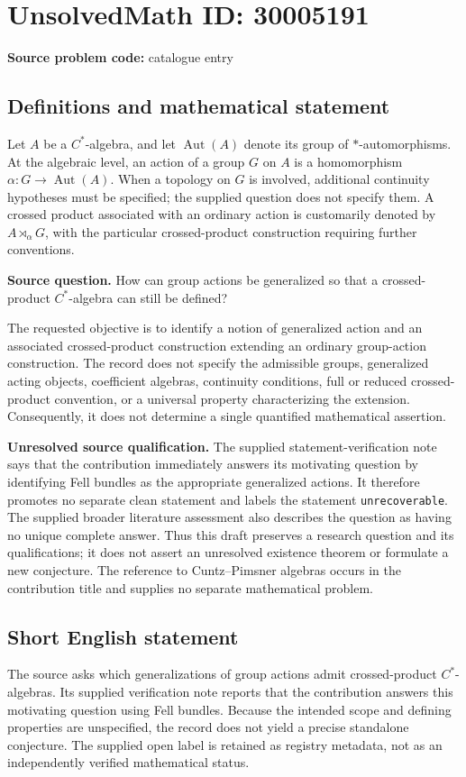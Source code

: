 \documentclass[11pt]{article}
\begin{document}
\section*{UnsolvedMath ID: 30005191}
\textbf{Source problem code:} catalogue entry
\subsection{Definitions and mathematical statement}
Let \(A\) be a \(C^*\)-algebra, and let \(\operatorname{Aut}(A)\) denote its group of \(*\)-automorphisms. At the algebraic level, an action of a group \(G\) on \(A\) is a homomorphism \(\alpha\colon G\to\operatorname{Aut}(A)\). When a topology on \(G\) is involved, additional continuity hypotheses must be specified; the supplied question does not specify them. A crossed product associated with an ordinary action is customarily denoted by \(A\rtimes_\alpha G\), with the particular crossed-product construction requiring further conventions.

\textbf{Source question.} How can group actions be generalized so that a crossed-product \(C^*\)-algebra can still be defined?

The requested objective is to identify a notion of generalized action and an associated crossed-product construction extending an ordinary group-action construction. The record does not specify the admissible groups, generalized acting objects, coefficient algebras, continuity conditions, full or reduced crossed-product convention, or a universal property characterizing the extension. Consequently, it does not determine a single quantified mathematical assertion.

\textbf{Unresolved source qualification.} The supplied statement-verification note says that the contribution immediately answers its motivating question by identifying Fell bundles as the appropriate generalized actions. It therefore promotes no separate clean statement and labels the statement \texttt{unrecoverable}. The supplied broader literature assessment also describes the question as having no unique complete answer. Thus this draft preserves a research question and its qualifications; it does not assert an unresolved existence theorem or formulate a new conjecture. The reference to Cuntz--Pimsner algebras occurs in the contribution title and supplies no separate mathematical problem.
\subsection{Short English statement}
The source asks which generalizations of group actions admit crossed-product \(C^*\)-algebras. Its supplied verification note reports that the contribution answers this motivating question using Fell bundles. Because the intended scope and defining properties are unspecified, the record does not yield a precise standalone conjecture. The supplied open label is retained as registry metadata, not as an independently verified mathematical status.
\end{document}
